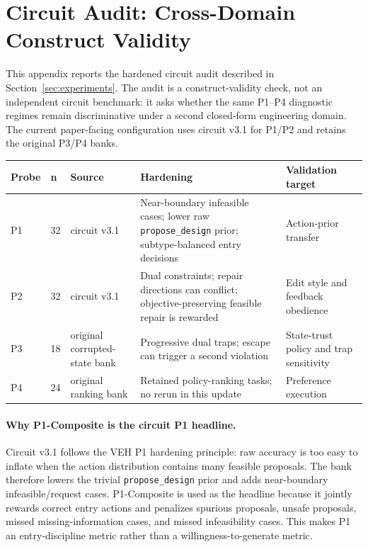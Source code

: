 \section{Circuit Audit: Cross-Domain Construct Validity}

This appendix reports the hardened circuit audit described in Section~\ref{sec:experiments}. The audit is a construct-validity check, not an independent circuit benchmark: it asks whether the same P1--P4 diagnostic regimes remain discriminative under a second closed-form engineering domain. The current paper-facing configuration uses circuit v3.1 for P1/P2 and retains the original P3/P4 banks.

\begin{center}
\label{tab:appendix_circuit_inventory}
\scriptsize
\setlength{\tabcolsep}{4pt}
\renewcommand{\arraystretch}{1.08}
\begin{tabular}{lp{9mm}p{36mm}p{50mm}p{46mm}}
\toprule
Probe & n & Source & Hardening & Validation target \\
\midrule
P1 & 32 & circuit v3.1 & Near-boundary infeasible cases; lower raw \texttt{propose\_design} prior; subtype-balanced entry decisions & Action-prior transfer \\
P2 & 32 & circuit v3.1 & Dual constraints; repair directions can conflict; objective-preserving feasible repair is rewarded & Edit style and feedback obedience \\
P3 & 18 & original corrupted-state bank & Progressive dual traps; escape can trigger a second violation & State-trust policy and trap sensitivity \\
P4 & 24 & original ranking bank & Retained policy-ranking tasks; no rerun in this update & Preference execution \\
\bottomrule
\end{tabular}
\end{center}

\paragraph{Why P1-Composite is the circuit P1 headline.}
Circuit v3.1 follows the VEH P1 hardening principle: raw accuracy is too easy to inflate when the action distribution contains many feasible proposals. The bank therefore lowers the trivial \texttt{propose\_design} prior and adds near-boundary infeasible/request cases. P1-Composite is used as the headline because it jointly rewards correct entry actions and penalizes spurious proposals, unsafe proposals, missed missing-information cases, and missed infeasibility cases. This makes P1 an entry-discipline metric rather than a willingness-to-generate metric.

